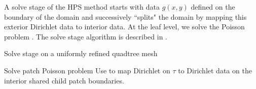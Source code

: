 A solve stage of the HPS method starts with data $g(x,y)$ defined on the boundary of the domain and successively ``splits" the domain by mapping this exterior Dirichlet data to interior data.  At the leaf level, we solve the Poisson problem .  The solve stage algorithm is described in .
\begin{algorithm}[H]
    \caption{Solve stage on a uniformly refined quadtree mesh}
    \begin{algorithmic}[0]
         
                \State Solve patch Poisson problem 
            \Else{} 
                \State Use  to map Dirichlet \gext on $\tau$ to Dirichlet data \gint on the interior shared child patch boundaries.
            \EndIf
        \EndFor
    \end{algorithmic}
    \label{alg:solve_uniform}
\end{algorithm}




